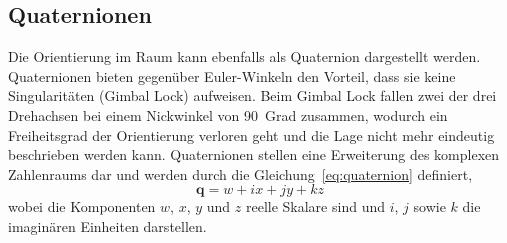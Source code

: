 \subsection{Quaternionen}
Die Orientierung im Raum kann ebenfalls als Quaternion dargestellt werden.
Quaternionen bieten gegenüber Euler-Winkeln den Vorteil, dass sie keine Singularitäten (Gimbal Lock) aufweisen.
Beim Gimbal Lock fallen zwei der drei Drehachsen bei einem Nickwinkel von 90~Grad zusammen, 
wodurch ein Freiheitsgrad der Orientierung verloren geht und die Lage nicht mehr eindeutig beschrieben werden kann.
Quaternionen stellen eine Erweiterung des komplexen Zahlenraums dar und werden durch die Gleichung~\ref{eq:quaternion} definiert,
\begin{equation}
\mathbf{q} = w + ix + jy + kz
\label{eq:quaternion}
\end{equation}
wobei die Komponenten $w$, $x$, $y$ und $z$ reelle Skalare sind und $i$, $j$ sowie $k$ die imaginären Einheiten darstellen.~\cite{Siciliano2009}


